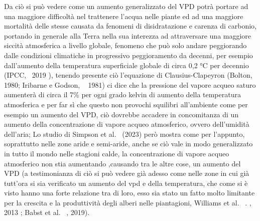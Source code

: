 Da ciò si può vedere come un aumento generalizzato del VPD potrà portare ad una maggiore difficoltà nel trattenere l'acqua nelle piante ed ad una maggiore mortalità delle stesse causata da fenomeni di disidratazione e carenza di carbonio, portando in generale alla Terra nella sua interezza ad attraversare una maggiore siccità atmosferica a livello globale, fenomeno che può solo andare peggiorando dalle condizioni climatiche in progressivo peggioramento da decenni, per esempio dall'aumento della temperatura superficiale globale di circa 0,2 °C per decennio (IPCC,~\cite{ipcc2019report} 2019 ), tenendo presente ciò l'equazione di Clausius-Clapeyron (Bolton,~\cite{bolton1980computation} 1980; Iribarne e Godson, ~\cite{iribarne1981atmospheric} 1981) ci dice che  la pressione del vapore acqueo saturo aumenterà di circa il 7\% per ogni grado kelvin di aumento della temperatura atmosferica e per far sì che questo non provochi squilibri all'ambiente come per esempio un aumento del VPD, ciò dovrebbe accadere in concomitanza di un aumento della concentrazione di vapore acqueo atmosferico, ovvero dell'umidità dell'aria; Lo studio di Simpson et al.~\cite{simpson2023arid} (2023) però mostra come per l'appunto, soprattutto nelle zone aride e semi-aride, anche se ciò vale in modo generalizzato in tutto il mondo nelle stagioni calde, la concentrazione di vapore acqueo atmosferico non stia aumentando ,causando tra le altre cose, un aumento del VPD (a testimonianza di ciò si può vedere già adesso come nelle zone in cui già tutt'ora si sia verificato un aumento del vpd e della temperatura, che come si è visto hanno una forte relazione tra di loro, esso sia stato un fatto molto limitante per la crescita e la produttività degli alberi nelle piantagioni, Williams et al.~\cite{williams2013forest} . , 2013 ; Babst et al.~\cite{babst2019twentieth} , 2019).\\
